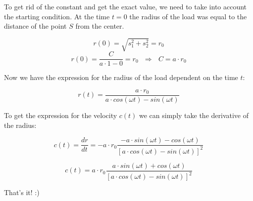 \documentclass[11pt]{article}
\begin{document}
To get rid of the constant and get the exact value, we need to take into account the starting condition. At the time $t=0$ the radius of the load was equal to the distance of the point $S$ from the center.

\[ r(0) = \sqrt{s_1^2 + s_2^2} = r_0 \]
\[ r(0) = \frac{C}{a\cdot 1 - 0} = r_0 \ \ \ \Rightarrow \ \ \ C = a\cdot r_0 \]

Now we have the expression for the radius of the load dependent on the time $t$:

\[ r(t) = \frac{a\cdot r_0}{a\cdot cos(\omega t) - sin(\omega t)}\]

To get the expression for the velocity $c(t)$ we can simply take the derivative of the radius:

\[ c(t) = \frac{dr}{dt} = -a\cdot r_0 \frac{-a\cdot sin(\omega t) - cos(\omega t)}{[a\cdot cos(\omega t) - sin(\omega t)]^2}\]

\[ c(t) = a\cdot r_0 \frac{a\cdot sin(\omega t) + cos(\omega t)}{[a\cdot cos(\omega t) - sin(\omega t)]^2} \]

That's it! :)
\end{document}
